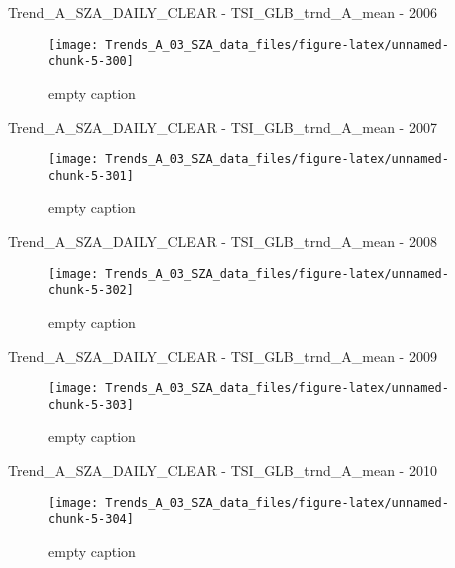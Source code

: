 \documentclass[
  10pt,
  a4paper,oneside]{article}
\begin{document}
Trend\_A\_SZA\_DAILY\_CLEAR - TSI\_GLB\_trnd\_A\_mean - 2006

\begin{figure}[!ht]

{\centering \texttt{[image: Trends\_A\_03\_SZA\_data\_files/figure-latex/unnamed-chunk-5-300]} 

}

\caption{ empty caption }\label{fig:unnamed-chunk-5-300}
\end{figure}

Trend\_A\_SZA\_DAILY\_CLEAR - TSI\_GLB\_trnd\_A\_mean - 2007

\begin{figure}[!ht]

{\centering \texttt{[image: Trends\_A\_03\_SZA\_data\_files/figure-latex/unnamed-chunk-5-301]} 

}

\caption{ empty caption }\label{fig:unnamed-chunk-5-301}
\end{figure}

Trend\_A\_SZA\_DAILY\_CLEAR - TSI\_GLB\_trnd\_A\_mean - 2008

\begin{figure}[!ht]

{\centering \texttt{[image: Trends\_A\_03\_SZA\_data\_files/figure-latex/unnamed-chunk-5-302]} 

}

\caption{ empty caption }\label{fig:unnamed-chunk-5-302}
\end{figure}

Trend\_A\_SZA\_DAILY\_CLEAR - TSI\_GLB\_trnd\_A\_mean - 2009

\begin{figure}[!ht]

{\centering \texttt{[image: Trends\_A\_03\_SZA\_data\_files/figure-latex/unnamed-chunk-5-303]} 

}

\caption{ empty caption }\label{fig:unnamed-chunk-5-303}
\end{figure}

Trend\_A\_SZA\_DAILY\_CLEAR - TSI\_GLB\_trnd\_A\_mean - 2010

\begin{figure}[!ht]

{\centering \texttt{[image: Trends\_A\_03\_SZA\_data\_files/figure-latex/unnamed-chunk-5-304]} 

}

\caption{ empty caption }\label{fig:unnamed-chunk-5-304}
\end{figure}
\end{document}
